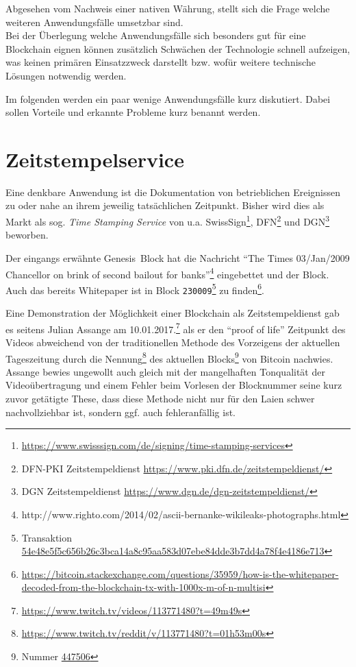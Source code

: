 Abgesehen vom Nachweis einer nativen Währung, stellt sich die Frage welche weiteren Anwendungsfälle umsetzbar sind. \\
Bei der Überlegung welche Anwendungsfälle sich besonders gut für eine Blockchain eignen können zusätzlich Schwächen der Technologie schnell aufzeigen, was keinen primären Einsatzzweck darstellt bzw. wofür weitere technische Lösungen notwendig werden.


Im folgenden werden ein paar wenige Anwendungsfälle kurz diskutiert. Dabei sollen Vorteile und erkannte Probleme kurz benannt werden.

\section{Zeitstempelservice}

Eine denkbare Anwendung ist die Dokumentation von betrieblichen Ereignissen zu oder nahe an ihrem jeweilig tatsächlichen Zeitpunkt.
Bisher wird dies als Markt als sog. \emph{Time Stamping Service} von u.a. SwissSign\footnote{\url{https://www.swisssign.com/de/signing/time-stamping-services}}, \gls{DFN}\footnote{\gls{DFN}-\gls{PKI} Zeitstempeldienst \url{https://www.pki.dfn.de/zeitstempeldienst/}} und \gls{DGN}\footnote{\gls{DGN} Zeitstempeldienst \url{https://www.dgn.de/dgn-zeitstempeldienst/}} beworben.

Der eingangs erwähnte Genesis~Block hat die Nachricht \enquote{The Times 03/Jan/2009 Chancellor on brink of second bailout for banks}\footnote{http://www.righto.com/2014/02/ascii-bernanke-wikileaks-photographs.html} eingebettet und der Block. Auch das bereits Whitepaper \autocite{p:bitcoin} ist in Block \texttt{230009}\footnote{Transaktion \href{https://blockchain.info/tx/54e48e5f5c656b26c3bca14a8c95aa583d07ebe84dde3b7dd4a78f4e4186e713}{54e48e5f5c656b26c3bca14a8c95aa583d07ebe84dde3b7dd4a78f4e4186e713}} zu finden\footnote{\url{https://bitcoin.stackexchange.com/questions/35959/how-is-the-whitepaper-decoded-from-the-blockchain-tx-with-1000x-m-of-n-multisi}}.

Eine Demonstration der Möglichkeit einer Blockchain als Zeitstempeldienst gab es seitens Julian Assange am 10.01.2017.\footnote{\url{https://www.twitch.tv/videos/113771480?t=49m49s}} als er den \enquote{proof of life} Zeitpunkt des Videos abweichend von der traditionellen Methode des Vorzeigens der aktuellen Tageszeitung durch die Nennung\footnote{\url{https://www.twitch.tv/reddit/v/113771480?t=01h53m00s}} des aktuellen Blocks\footnote{Nummer \href{https://blockchain.info/block/00000000000000000178374f687728789caa92ecb49b4d850dfc173a7c0351e6}{447506}} von Bitcoin nachwies. \\
Assange bewies ungewollt auch gleich mit der mangelhaften Tonqualität der Videoübertragung und einem Fehler beim Vorlesen der Blocknummer seine kurz zuvor getätigte These, dass diese Methode nicht nur für den Laien schwer nachvollziehbar ist, sondern ggf. auch fehleranfällig ist.

